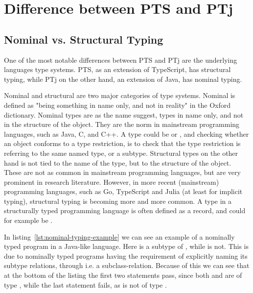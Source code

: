 
\chapter{Difference between PTS and PTj}\label{ch:difference-between-pts-and-ptj}


\section{Nominal vs. Structural Typing}\label{sec:nominal-vs-structural-typing}


One of the most notable differences between PTS and PTj are the underlying languages type systems.
PTS, as an extension of TypeScript, has structural typing, while PTj on the other hand, an extension of Java, has nominal typing.

Nominal and structural are two major categories of type systems.
Nominal is defined as "being something in name only, and not in reality" in the Oxford dictionary.
Nominal types are as the name suggest, types in name only, and not in the structure of the object.
They are the norm in mainstream programming languages, such as Java, C, and C++.
A type could be  or , and checking whether an object conforms to a type restriction, is to check that the type restriction is referring to the same named type, or a subtype.
Structural types on the other hand is not tied to the name of the type, but to the structure of the object.
These are not as common in mainstream programming languages, but are very prominent in research literature.
However, in more recent (mainstream) programming languages, such as Go, TypeScript and Julia (at least for implicit typing), structural typing is becoming more and more common.
A type in a structurally typed programming language is often defined as a record, and could for example be .

In listing~\vref{lst:nominal-typing-example} we can see an example of a nominally typed program in a Java-like language.
Here  is a subtype of , while  is not.
This is due to nominally typed programs having the requirement of explicitly naming its subtype relations, through i.e. a subclass-relation.
Because of this we can see that at the bottom of the listing the first two statements pass, since both  and  are of type , while the last statement fails, as  is not of type .

